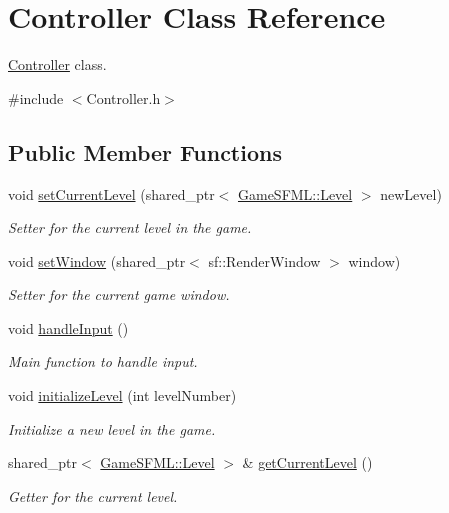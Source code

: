 \hypertarget{classController}{}\section{Controller Class Reference}
\label{classController}


\hyperlink{classController}{Controller} class.  




{\ttfamily \#include $<$Controller.\+h$>$}

\subsection*{Public Member Functions}
\begin{DoxyCompactItemize}
\item 
void \hyperlink{classController_aa89ab5fe861da53f35c48f03005486de}{set\+Current\+Level} (shared\+\_\+ptr$<$ \hyperlink{classGameSFML_1_1Level}{Game\+S\+F\+M\+L\+::\+Level} $>$ new\+Level)
\begin{DoxyCompactList}\small\item\em Setter for the current level in the game. \end{DoxyCompactList}\item 
void \hyperlink{classController_a6ecc2df639760a276d0b9bf2f05ad3ab}{set\+Window} (shared\+\_\+ptr$<$ sf\+::\+Render\+Window $>$ window)
\begin{DoxyCompactList}\small\item\em Setter for the current game window. \end{DoxyCompactList}\item 
void \hyperlink{classController_aa8caf600ecfb41c59da3df61cd1291b2}{handle\+Input} ()
\begin{DoxyCompactList}\small\item\em Main function to handle input. \end{DoxyCompactList}\item 
void \hyperlink{classController_a3742c489d3d26781155fcb7c06b6dfaa}{initialize\+Level} (int level\+Number)
\begin{DoxyCompactList}\small\item\em Initialize a new level in the game. \end{DoxyCompactList}\item 
shared\+\_\+ptr$<$ \hyperlink{classGameSFML_1_1Level}{Game\+S\+F\+M\+L\+::\+Level} $>$ \& \hyperlink{classController_ad4126984329d864fcd63b10103c6e138}{get\+Current\+Level} ()
\begin{DoxyCompactList}\small\item\em Getter for the current level. \end{DoxyCompactList}\end{DoxyCompactItemize}
